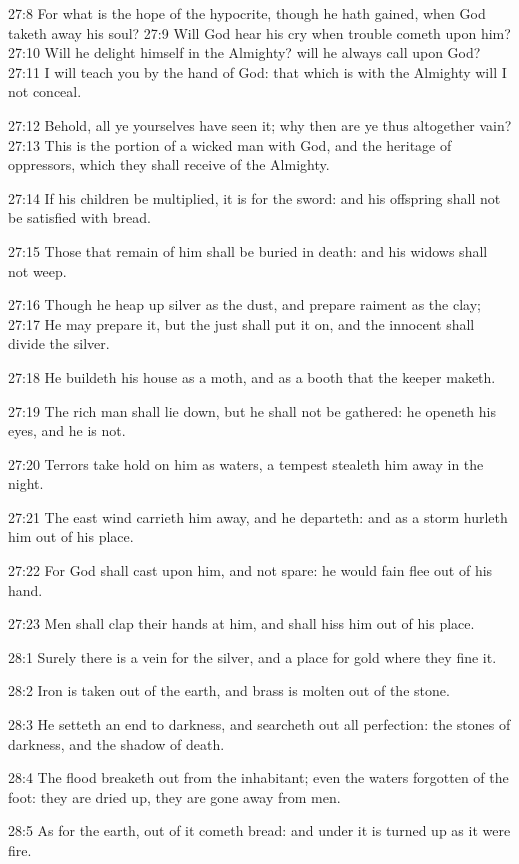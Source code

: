27:8 For what is the hope of the hypocrite, though he hath gained, when God taketh away his soul?  27:9 Will God hear his cry when trouble cometh upon him?  27:10 Will he delight himself in the Almighty? will he always call upon God?  27:11 I will teach you by the hand of God: that which is with the Almighty will I not conceal.

27:12 Behold, all ye yourselves have seen it; why then are ye thus altogether vain?  27:13 This is the portion of a wicked man with God, and the heritage of oppressors, which they shall receive of the Almighty.

27:14 If his children be multiplied, it is for the sword: and his offspring shall not be satisfied with bread.

27:15 Those that remain of him shall be buried in death: and his widows shall not weep.

27:16 Though he heap up silver as the dust, and prepare raiment as the clay; 27:17 He may prepare it, but the just shall put it on, and the innocent shall divide the silver.

27:18 He buildeth his house as a moth, and as a booth that the keeper maketh.

27:19 The rich man shall lie down, but he shall not be gathered: he openeth his eyes, and he is not.

27:20 Terrors take hold on him as waters, a tempest stealeth him away in the night.

27:21 The east wind carrieth him away, and he departeth: and as a storm hurleth him out of his place.

27:22 For God shall cast upon him, and not spare: he would fain flee out of his hand.

27:23 Men shall clap their hands at him, and shall hiss him out of his place.

28:1 Surely there is a vein for the silver, and a place for gold where they fine it.

28:2 Iron is taken out of the earth, and brass is molten out of the stone.

28:3 He setteth an end to darkness, and searcheth out all perfection: the stones of darkness, and the shadow of death.

28:4 The flood breaketh out from the inhabitant; even the waters forgotten of the foot: they are dried up, they are gone away from men.

28:5 As for the earth, out of it cometh bread: and under it is turned up as it were fire.


